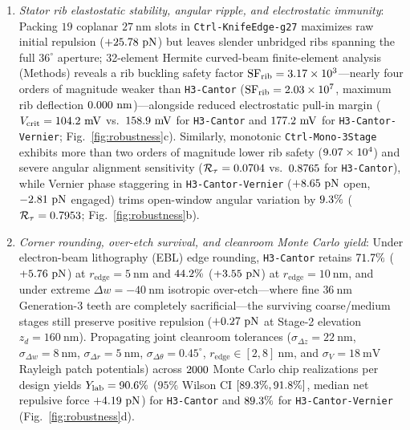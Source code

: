 \documentclass[pdflatex,sn-nature]{sn-jnl}
\DeclareRobustCommand{\roundone}[1]{\fpeval{round(#1,1)}}
\DeclareRobustCommand{\roundtwo}[1]{\fpeval{round(#1,2)}}
\begin{document}
\begin{enumerate}
    \item \emph{Stator rib elastostatic stability, angular ripple, and electrostatic immunity}: Packing $19$ coplanar $27\ \mathrm{nm}$ slots in \texttt{Ctrl-KnifeEdge-g27} maximizes raw initial repulsion ($+25.78{}\ \mathrm{pN}$) but leaves slender unbridged ribs spanning the full $36^\circ$ aperture; 32-element Hermite curved-beam finite-element analysis (Methods) reveals a rib buckling safety factor $\mathrm{SF}_{\mathrm{rib}} = 3.17\times 10^{3}{}$---nearly four orders of magnitude weaker than \texttt{H3-Cantor} ($\mathrm{SF}_{\mathrm{rib}} = 2.03\times 10^{7}{}$, maximum rib deflection $0.000{}\ \mathrm{nm}$)---alongside reduced electrostatic pull-in margin ($V_{\mathrm{crit}} = 104.2{}\ \mathrm{mV}$ vs.\ $158.9{}\ \mathrm{mV}$ for \texttt{H3-Cantor} and $177.2{}\ \mathrm{mV}$ for \texttt{H3-Cantor-Vernier}; Fig.~\ref{fig:robustness}c). Similarly, monotonic \texttt{Ctrl-Mono-3Stage} exhibits more than two orders of magnitude lower rib safety ($9.07\times 10^{4}{}$) and severe angular alignment sensitivity ($\mathcal{R}_\tau = 0.0704{}$ vs.\ $0.8765{}$ for \texttt{H3-Cantor}), while Vernier phase staggering in \texttt{H3-Cantor-Vernier} ($+8.65{}\ \mathrm{pN}$ open, $-2.81{}\ \mathrm{pN}$ engaged) trims open-window angular variation by $\roundone{\fpeval{(1 - \HthreeRobustTorqueRipple / \HthreeSymTorqueRipple) * 100}}\%$ ($\mathcal{R}_\tau = 0.7953{}$; Fig.~\ref{fig:robustness}b).
    \item \emph{Corner rounding, over-etch survival, and cleanroom Monte Carlo yield}: Under electron-beam lithography (EBL) edge rounding, \texttt{H3-Cantor} retains $71.7{}\%$ ($+\roundtwo{\fpeval{\HthreeSymFzOpPn * \HthreeSymRfiveRetPctDisp / 100}}\ \mathrm{pN}$) at $r_{\mathrm{edge}}=5\ \mathrm{nm}$ and $44.2{}\%$ ($+\roundtwo{\fpeval{\HthreeSymFzOpPn * \HthreeSymRonezeroRetPctDisp / 100}}\ \mathrm{pN}$) at $r_{\mathrm{edge}}=10\ \mathrm{nm}$, and under extreme $\Delta w = -40\ \mathrm{nm}$ isotropic over-etch---where fine $36\ \mathrm{nm}$ Generation-3 teeth are completely sacrificial---the surviving coarse/medium stages still preserve positive repulsion ($+0.27{}\ \mathrm{pN}$ at Stage-2 elevation $z_d = 160\ \mathrm{nm}$). Propagating joint cleanroom tolerances ($\sigma_{\Delta z}=22\ \mathrm{nm}$, $\sigma_{\Delta w}=8\ \mathrm{nm}$, $\sigma_{\Delta r}=5\ \mathrm{nm}$, $\sigma_{\Delta\theta}=0.45^\circ$, $r_{\mathrm{edge}} \in [2,8]\ \mathrm{nm}$, and $\sigma_V = 18\ \mathrm{mV}$ Rayleigh patch potentials) across $2000{}$ Monte Carlo chip realizations per design yields $Y_{\mathrm{lab}} = \roundone{\HthreeSymYieldPct}\%$ ($95\%$ Wilson CI $[89.3{}\%, 91.8{}\%]$, median net repulsive force $+\roundtwo{\HthreeSymMedianMcFzPn}\ \mathrm{pN}$) for \texttt{H3-Cantor} and $89.3{}\%$ for \texttt{H3-Cantor-Vernier} (Fig.~\ref{fig:robustness}d).

\end{enumerate}
\end{document}
